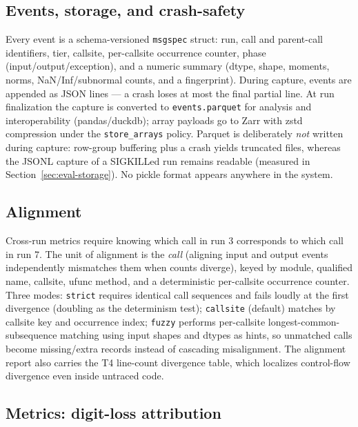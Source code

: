 \subsection{Events, storage, and crash-safety}
\label{sec:design-storage}

Every event is a schema-versioned \texttt{msgspec} struct: run, call and
parent-call identifiers, tier, callsite, per-callsite occurrence counter,
phase (input/output/exception), and a numeric summary (dtype, shape,
moments, norms, NaN/Inf/subnormal counts, and a fingerprint). During
capture, events are appended as JSON lines --- a crash loses at most the
final partial line. At run finalization the capture is converted to
\texttt{events.parquet} for analysis and interoperability
(pandas/duckdb); array payloads go to Zarr with zstd compression under
the \texttt{store\_arrays} policy. Parquet is deliberately \emph{not}
written during capture: row-group buffering plus a crash yields truncated
files, whereas the JSONL capture of a SIGKILLed run remains readable
(measured in Section~\ref{sec:eval-storage}). No pickle format appears
anywhere in the system.

\subsection{Alignment}
\label{sec:design-alignment}

Cross-run metrics require knowing which call in run 3 corresponds to
which call in run 7. The unit of alignment is the \emph{call} (aligning
input and output events independently mismatches them when counts
diverge), keyed by module, qualified name, callsite, ufunc method, and a
deterministic per-callsite occurrence counter. Three modes:
\texttt{strict} requires identical call sequences and fails loudly at the
first divergence (doubling as the determinism test); \texttt{callsite}
(default) matches by callsite key and occurrence index;
\texttt{fuzzy} performs per-callsite longest-common-subsequence matching
using input shapes and dtypes as hints, so unmatched calls become
missing/extra records instead of cascading misalignment. The alignment
report also carries the T4 line-count divergence table, which localizes
control-flow divergence even inside untraced code.

\subsection{Metrics: digit-loss attribution}
\label{sec:design-metrics}

